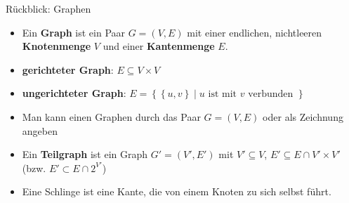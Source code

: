 %	

\begin{frame}{Rückblick: Graphen}
	\begin{itemize}[<+->]
		\item Ein \textbf{Graph} ist ein Paar $G=(V,E)$ mit einer endlichen, nichtleeren \textbf{Knotenmenge} $V$ und einer \textbf{Kantenmenge} $E$.
		\item \textbf{gerichteter Graph}: $E \subseteq V \times V$
		\item \textbf{ungerichteter Graph}: $E = \left\{ \left\{u,v\right\} \middle| u \text{ ist mit } v \text{ verbunden }\right\}$
		\item Man kann einen Graphen durch das Paar $G=(V,E)$ oder als Zeichnung angeben
		\item Ein \textbf{Teilgraph} ist ein Graph $G'=(V',E')$ mit $V' \subseteq V$, $E' \subseteq E \cap V' \times V'$ (bzw. $E' \subset E \cap 2^{V'}$)
		\item Eine Schlinge ist eine Kante, die von einem Knoten zu sich selbst führt.
	\end{itemize}
\end{frame}






